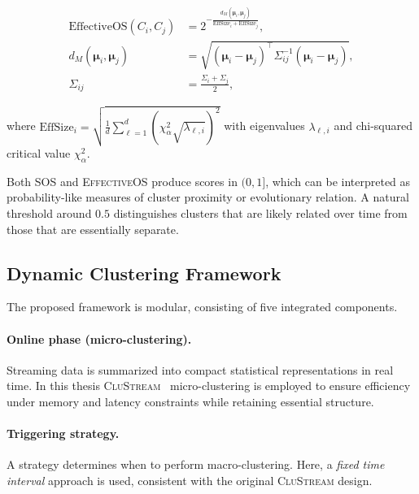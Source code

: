 {\scriptsize
\begin{align}
    \text{EffectiveOS}(C_i, C_j)                & = 2^{- \frac{d_M(\boldsymbol{\mu}_i, \boldsymbol{\mu}_j)}{\text{EffSize}_i + \text{EffSize}_j}},                    \\
    d_M(\boldsymbol{\mu}_i, \boldsymbol{\mu}_j) & = \sqrt{(\boldsymbol{\mu}_i - \boldsymbol{\mu}_j)^\top \Sigma_{ij}^{-1} (\boldsymbol{\mu}_i - \boldsymbol{\mu}_j)}, \\
    \Sigma_{ij}                                 & = \frac{\Sigma_i + \Sigma_j}{2},
\end{align}}

where $\text{EffSize}_i = \sqrt{\frac{1}{d} \sum_{\ell=1}^{d} (\chi^2_\alpha
        \sqrt{\lambda_{\ell,i}})^2}$ with eigenvalues $\lambda_{\ell,i}$ and
chi-squared critical value $\chi^2_\alpha$.

Both \textsc{SOS} and \textsc{EffectiveOS} produce scores in $(0,1]$, which can
be interpreted as probability-like measures of cluster proximity or
evolutionary relation. A natural threshold around $0.5$ distinguishes clusters
that are likely related over time from those that are essentially separate.

\subsection{Dynamic Clustering Framework}\label{subsec:dynamic_clustering_framework}

The proposed framework is modular, consisting of five integrated components.

\paragraph{Online phase (micro-clustering).}
Streaming data is summarized into compact statistical representations in real
time. In this thesis \textsc{CluStream}~\cite{clustream} micro-clustering is
employed to ensure efficiency under memory and latency constraints while
retaining essential structure.



\paragraph{Triggering strategy.}
A strategy determines when to perform macro-clustering. Here, a \emph{fixed
    time interval} approach is used, consistent with the original
\textsc{CluStream} design.

